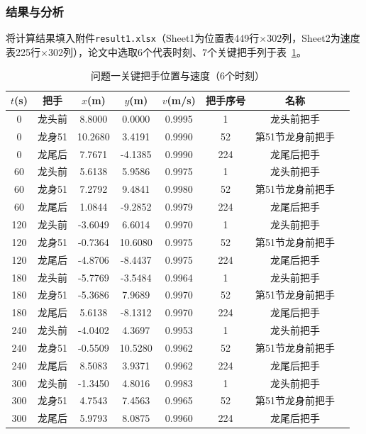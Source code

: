 \documentclass[12pt]{ctexart}
\begin{document}
\subsubsection{结果与分析}

将计算结果填入附件\texttt{result1.xlsx}（Sheet1为位置表449行$\times$302列，Sheet2为速度表225行$\times$302列），论文中选取6个代表时刻、7个关键把手列于表~\ref{tab:q1_key}。

\begin{table}[htbp]
\centering
\caption{问题一关键把手位置与速度（6个时刻）}
\label{tab:q1_key}
\small
\begin{tabular}{cccccccc}
\toprule
$t$(s) & 把手 & $x$(m) & $y$(m) & $v$(m/s) & 把手序号 & 名称 \\
\midrule
0   & 龙头前 & 8.8000 & 0.0000 & 0.9995 & 1  & 龙头前把手 \\
0   & 龙身51 & 10.2680 & 3.4191 & 0.9990 & 52 & 第51节龙身前把手 \\
0   & 龙尾后 & 7.7671 & -4.1385 & 0.9990 & 224& 龙尾后把手 \\
\midrule
60  & 龙头前 & 5.6138 & 5.9586 & 0.9975 & 1  & 龙头前把手 \\
60  & 龙身51 & 7.2792 & 9.4841 & 0.9980 & 52 & 第51节龙身前把手 \\
60  & 龙尾后 & 1.0844 & -9.2852 & 0.9979 & 224& 龙尾后把手 \\
\midrule
120 & 龙头前 & -3.6049 & 6.6014 & 0.9970 & 1  & 龙头前把手 \\
120 & 龙身51 & -0.7364 & 10.6080 & 0.9975 & 52 & 第51节龙身前把手 \\
120 & 龙尾后 & -4.8706 & -8.4437 & 0.9975 & 224& 龙尾后把手 \\
\midrule
180 & 龙头前 & -5.7769 & -3.5484 & 0.9964 & 1  & 龙头前把手 \\
180 & 龙身51 & -5.3686 & 7.9689 & 0.9970 & 52 & 第51节龙身前把手 \\
180 & 龙尾后 & 5.6138 & -8.1312 & 0.9970 & 224& 龙尾后把手 \\
\midrule
240 & 龙头前 & -4.0402 & 4.3697 & 0.9953 & 1  & 龙头前把手 \\
240 & 龙身51 & -0.5509 & 10.5280 & 0.9962 & 52 & 第51节龙身前把手 \\
240 & 龙尾后 & 8.5083 & 3.9371 & 0.9962 & 224& 龙尾后把手 \\
\midrule
300 & 龙头前 & -1.3450 & 4.8016 & 0.9983 & 1  & 龙头前把手 \\
300 & 龙身51 & 4.7543 & 7.4563 & 0.9965 & 52 & 第51节龙身前把手 \\
300 & 龙尾后 & 5.9793 & 8.0875 & 0.9960 & 224& 龙尾后把手 \\
\bottomrule
\end{tabular}
\end{table}
\end{document}
